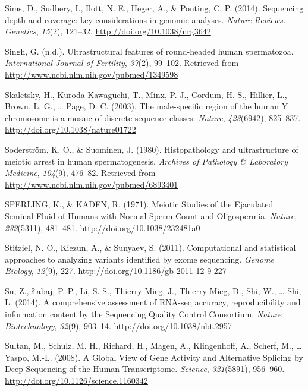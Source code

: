 \documentclass[12pt,twoside]{reedthesis}
\theoremstyle{definition}
\theoremstyle{definition}
\theoremstyle{remark}
\begin{document}
  \hypertarget{ref-Sims2014}{}
  Sims, D., Sudbery, I., Ilott, N. E., Heger, A., \& Ponting, C. P.
  (2014). Sequencing depth and coverage: key considerations in genomic
  analyses. \emph{Nature Reviews. Genetics}, \emph{15}(2), 121--32.
  \url{http://doi.org/10.1038/nrg3642}
  
  \hypertarget{ref-Singh}{}
  Singh, G. (n.d.). Ultrastructural features of round-headed human
  spermatozoa. \emph{International Journal of Fertility}, \emph{37}(2),
  99--102. Retrieved from \url{http://www.ncbi.nlm.nih.gov/pubmed/1349598}
  
  \hypertarget{ref-Skaletsky2003}{}
  Skaletsky, H., Kuroda-Kawaguchi, T., Minx, P. J., Cordum, H. S.,
  Hillier, L., Brown, L. G., \ldots{} Page, D. C. (2003). The
  male-specific region of the human Y chromosome is a mosaic of discrete
  sequence classes. \emph{Nature}, \emph{423}(6942), 825--837.
  \url{http://doi.org/10.1038/nature01722}
  
  \hypertarget{ref-Soderstrom1980}{}
  Soderström, K. O., \& Suominen, J. (1980). Histopathology and
  ultrastructure of meiotic arrest in human spermatogenesis.
  \emph{Archives of Pathology \& Laboratory Medicine}, \emph{104}(9),
  476--82. Retrieved from \url{http://www.ncbi.nlm.nih.gov/pubmed/6893401}
  
  \hypertarget{ref-SPERLING1971}{}
  SPERLING, K., \& KADEN, R. (1971). Meiotic Studies of the Ejaculated
  Seminal Fluid of Humans with Normal Sperm Count and Oligospermia.
  \emph{Nature}, \emph{232}(5311), 481--481.
  \url{http://doi.org/10.1038/232481a0}
  
  \hypertarget{ref-Stitziel2011}{}
  Stitziel, N. O., Kiezun, A., \& Sunyaev, S. (2011). Computational and
  statistical approaches to analyzing variants identified by exome
  sequencing. \emph{Genome Biology}, \emph{12}(9), 227.
  \url{http://doi.org/10.1186/gb-2011-12-9-227}
  
  \hypertarget{ref-Su2014}{}
  Su, Z., Łabaj, P. P., Li, S. S., Thierry-Mieg, J., Thierry-Mieg, D.,
  Shi, W., \ldots{} Shi, L. (2014). A comprehensive assessment of RNA-seq
  accuracy, reproducibility and information content by the Sequencing
  Quality Control Consortium. \emph{Nature Biotechnology}, \emph{32}(9),
  903--14. \url{http://doi.org/10.1038/nbt.2957}
  
  \hypertarget{ref-Sultan2008}{}
  Sultan, M., Schulz, M. H., Richard, H., Magen, A., Klingenhoff, A.,
  Scherf, M., \ldots{} Yaspo, M.-L. (2008). A Global View of Gene Activity
  and Alternative Splicing by Deep Sequencing of the Human Transcriptome.
  \emph{Science}, \emph{321}(5891), 956--960.
  \url{http://doi.org/10.1126/science.1160342}
  
\end{document}
